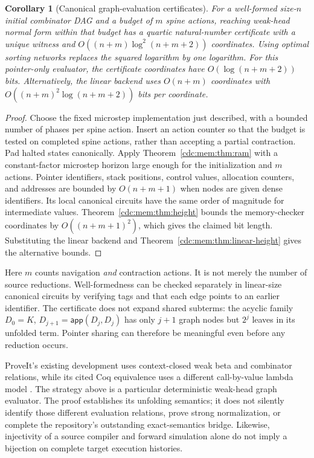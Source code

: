 \documentclass[11pt,a4paper]{article}
\newtheorem{corollary}[corollary]{Corollary}
\theoremstyle{definition}
\theoremstyle{remark}
\newcommand{\app}{\mathsf{app}}
\begin{document}
\begin{corollary}[Canonical graph-evaluation certificates]\label{cdc:mem:cor:graph}
For a well-formed size-$n$ initial combinator DAG and a budget of $m$ spine
actions, reaching weak-head normal form within that budget has a quartic
natural-number certificate with a unique witness and
$O((n+m)\log^2(n+m+2))$ coordinates. Using optimal sorting networks replaces
the squared logarithm by one logarithm. For this pointer-only evaluator, the
certificate coordinates have $O(\log(n+m+2))$ bits. Alternatively, the linear
backend uses $O(n+m)$ coordinates with
$O((n+m)^2\log(n+m+2))$ bits per coordinate.
\end{corollary}
\begin{proof}
Choose the fixed microstep implementation just described, with a bounded
number of phases per spine action. Insert an action counter so that the budget
is tested on completed spine actions, rather than accepting a partial
contraction. Pad halted states canonically. Apply Theorem~\ref{cdc:mem:thm:ram} with
a constant-factor microstep horizon large enough for the initialization and
$m$ actions. Pointer identifiers, stack positions, control values, allocation
counters, and addresses are bounded by $O(n+m+1)$ when nodes are given dense
identifiers. Its local canonical circuits have the same order of magnitude
for intermediate values. Theorem~\ref{cdc:mem:thm:height} bounds the memory-checker
coordinates by $O((n+m+1)^2)$, which gives the claimed bit length. Substituting the linear backend and
Theorem~\ref{cdc:mem:thm:linear-height} gives the alternative bounds.
\end{proof}

Here $m$ counts navigation \emph{and} contraction actions. It is not merely the
number of source reductions. Well-formedness can be checked separately in
linear-size canonical circuits by verifying tags and that each edge points to
an earlier identifier. The certificate does not expand shared subterms: the
acyclic family $D_0=K$, $D_{j+1}=\app(D_j,D_j)$ has only $j+1$ graph nodes but
$2^j$ leaves in its unfolded term. Pointer sharing can therefore be meaningful
even before any reduction occurs.

ProveIt's existing development uses context-closed weak beta and combinator
relations, while its cited Coq equivalence uses a different call-by-value
lambda model \cite{repo-cl}. The strategy above is a particular deterministic
weak-head graph evaluator. The proof establishes its unfolding semantics; it
does not silently identify those different evaluation relations, prove strong
normalization, or complete the repository's outstanding exact-semantics bridge.
Likewise, injectivity of a source compiler and forward simulation alone do not
imply a bijection on complete target execution histories.
\end{document}
